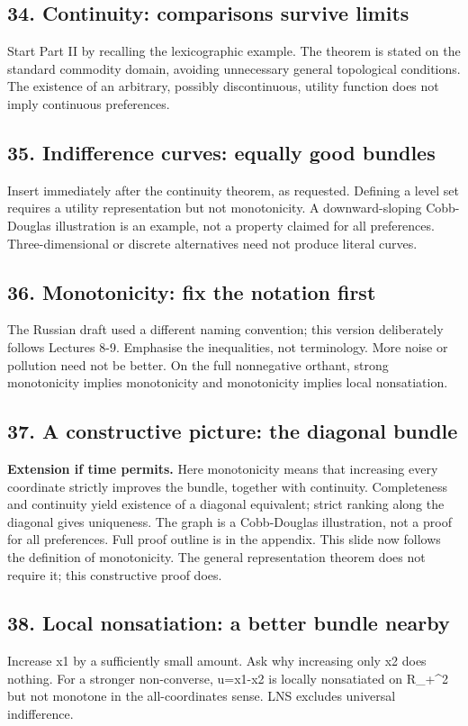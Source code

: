 \documentclass[11pt,a4paper]{article}
\begin{document}
\subsection*{34. Continuity: comparisons survive limits}
Start Part II by recalling the lexicographic example. The theorem is stated on the standard commodity domain, avoiding unnecessary general topological conditions. The existence of an arbitrary, possibly discontinuous, utility function does not imply continuous preferences.

\subsection*{35. Indifference curves: equally good bundles}
Insert immediately after the continuity theorem, as requested. Defining a level set requires a utility representation but not monotonicity. A downward-sloping Cobb-Douglas illustration is an example, not a property claimed for all preferences. Three-dimensional or discrete alternatives need not produce literal curves.

\subsection*{36. Monotonicity: fix the notation first}
The Russian draft used a different naming convention; this version deliberately follows Lectures 8-9. Emphasise the inequalities, not terminology. More noise or pollution need not be better. On the full nonnegative orthant, strong monotonicity implies monotonicity and monotonicity implies local nonsatiation.

\subsection*{37. A constructive picture: the diagonal bundle}
\textbf{Extension if time permits.} Here monotonicity means that increasing every coordinate strictly improves the bundle, together with continuity. Completeness and continuity yield existence of a diagonal equivalent; strict ranking along the diagonal gives uniqueness. The graph is a Cobb-Douglas illustration, not a proof for all preferences. Full proof outline is in the appendix. This slide now follows the definition of monotonicity. The general representation theorem does not require it; this constructive proof does.

\subsection*{38. Local nonsatiation: a better bundle nearby}
Increase x1 by a sufficiently small amount. Ask why increasing only x2 does nothing. For a stronger non-converse, u=x1-x2 is locally nonsatiated on R\_+\textasciicircum{}2 but not monotone in the all-coordinates sense. LNS excludes universal indifference.
\end{document}
